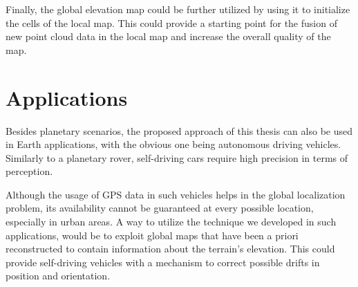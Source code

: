 Finally, the global elevation map could be further utilized by using it
to initialize the cells of the local map.
This could provide a starting point for the fusion of new point cloud
data in the local map and increase the overall quality of the map.

\section{Applications}

Besides planetary scenarios, the proposed approach of this thesis
can also be used in Earth applications, with the obvious one being
autonomous driving vehicles.
Similarly to a planetary rover, self-driving cars require high
precision in terms of perception.

Although the usage of GPS data in such vehicles helps in the global
localization problem, its availability cannot be guaranteed at every
possible location, especially in urban areas.
A way to utilize the technique we developed in such applications,
would be to exploit global maps that have been a priori reconstructed
to contain information about the terrain's elevation.
This could provide self-driving vehicles with a mechanism to correct
possible drifts in position and orientation.


